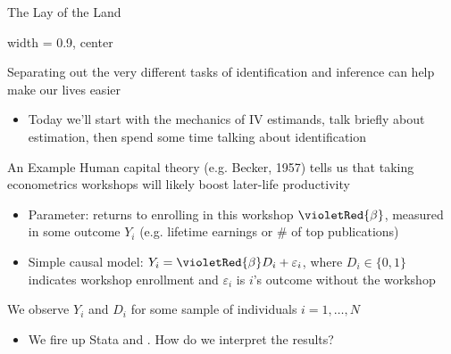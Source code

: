 \documentclass{beamer}
\begin{document}
\begin{frame}{The Lay of the Land}
  \begin{adjustbox}{width = 0.9\textwidth, center}
  \end{adjustbox}

  \vspace{4mm}
  {\small Separating out the very different tasks of identification and inference can help make our lives easier\smallskip\pause{}
\begin{itemize}
\item Today we'll start with the mechanics of IV estimands, talk briefly about estimation, then spend some time talking about identification
\end{itemize}}
\end{frame}

\begin{frame}{An Example}
Human capital theory (e.g. Becker, 1957) tells us that taking econometrics workshops will likely boost later-life productivity\pause
\begin{itemize}
  \item Parameter: returns to enrolling in this workshop $\violetRed{\beta}$, measured in some outcome $Y_i$ (e.g. lifetime earnings or \# of top publications)
  \item Simple causal model: $Y_i= \violetRed{\beta} D_i + \varepsilon_i$, where $D_i \in \{0,1\}$ indicates workshop enrollment and $\varepsilon_i$ is $i$'s outcome without the workshop
\end{itemize}\pause\medskip

We observe $Y_i$ and $D_i$ for some sample of individuals $i=1,\dots,N$
\begin{itemize}
  \item We fire up Stata and . \pause{} How do we interpret the results?
\end{itemize}

\end{frame}
\end{document}
